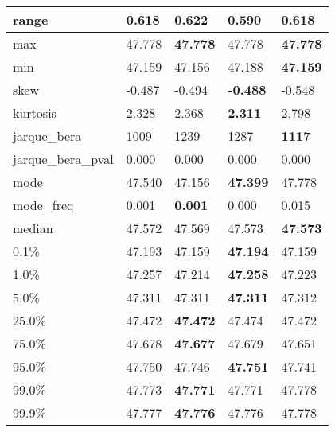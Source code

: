 \begin{table}[H]
\begin{tabular}{|l|m{10em}|m{10em}|m{10em}|m{10em}|}
\hline range & 0.618 & 0.622 & \cellcolor[rgb]{0.9, 0.54, 0.52} 0.590 & \bfseries 0.618 \\
\hline max & 47.778 & \bfseries 47.778 & \cellcolor[rgb]{0.9, 0.54, 0.52} 47.778 & \bfseries 47.778 \\
\hline min & 47.159 & 47.156 & \cellcolor[rgb]{0.9, 0.54, 0.52} 47.188 & \bfseries 47.159 \\
\hline skew & -0.487 & -0.494 & \bfseries -0.488 & \cellcolor[rgb]{0.9, 0.54, 0.52} -0.548 \\
\hline kurtosis & 2.328 & 2.368 & \bfseries 2.311 & \cellcolor[rgb]{0.9, 0.54, 0.52} 2.798 \\
\hline jarque\_bera & 1009 & 1239 & \cellcolor[rgb]{0.9, 0.54, 0.52} 1287 & \bfseries 1117 \\
\hline jarque\_bera\_pval & 0.000 & 0.000 & 0.000 & 0.000 \\
\hline mode & 47.540 & \cellcolor[rgb]{0.9, 0.54, 0.52} 47.156 & \bfseries 47.399 & 47.778 \\
\hline mode\_freq & 0.001 & \bfseries 0.001 & 0.000 & \cellcolor[rgb]{0.9, 0.54, 0.52} 0.015 \\
\hline median & 47.572 & \cellcolor[rgb]{0.9, 0.54, 0.52} 47.569 & 47.573 & \bfseries 47.573 \\
\hline 0.1\% & 47.193 & 47.159 & \bfseries 47.194 & \cellcolor[rgb]{0.9, 0.54, 0.52} 47.159 \\
\hline 1.0\% & 47.257 & \cellcolor[rgb]{0.9, 0.54, 0.52} 47.214 & \bfseries 47.258 & 47.223 \\
\hline 5.0\% & 47.311 & 47.311 & \bfseries 47.311 & \cellcolor[rgb]{0.9, 0.54, 0.52} 47.312 \\
\hline 25.0\% & 47.472 & \bfseries 47.472 & \cellcolor[rgb]{0.9, 0.54, 0.52} 47.474 & 47.472 \\
\hline 75.0\% & 47.678 & \bfseries 47.677 & 47.679 & \cellcolor[rgb]{0.9, 0.54, 0.52} 47.651 \\
\hline 95.0\% & 47.750 & 47.746 & \bfseries 47.751 & \cellcolor[rgb]{0.9, 0.54, 0.52} 47.741 \\
\hline 99.0\% & 47.773 & \bfseries 47.771 & 47.771 & \cellcolor[rgb]{0.9, 0.54, 0.52} 47.778 \\
\hline 99.9\% & 47.777 & \bfseries 47.776 & 47.776 & \cellcolor[rgb]{0.9, 0.54, 0.52} 47.778 \\
\hline
\end{tabular}
\end{table}
